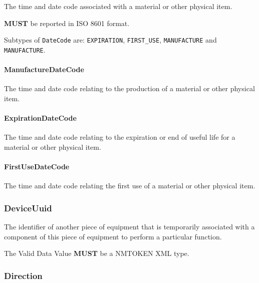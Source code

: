 The time and date code associated with a material or other physical item.
  
  \textbf{MUST} be reported in ISO 8601 format.


Subtypes of \texttt{DateCode} are: \texttt{EXPIRATION}, \texttt{FIRST_USE}, \texttt{MANUFACTURE} and \texttt{MANUFACTURE}. 
\FloatBarrier

\paragraph{ManufactureDateCode}\mbox{}
\label{sec:ManufactureDateCode}



The time and date code relating to the production of a material or other physical item.


\paragraph{ExpirationDateCode}\mbox{}
\label{sec:ExpirationDateCode}



The time and date code relating to the expiration or end of useful life for a material or other physical item.


\paragraph{FirstUseDateCode}\mbox{}
\label{sec:FirstUseDateCode}



The time and date code relating the first use of a material or other physical item.


\subsubsection{DeviceUuid}
\label{sec:DeviceUuid}



The identifier of another piece of equipment that is temporarily associated with a component of this piece of equipment to perform a particular function.
  
 The \gls{Valid Data Value} \textbf{MUST} be a NMTOKEN XML type.

\FloatBarrier

\subsubsection{Direction}
\label{sec:Direction}



